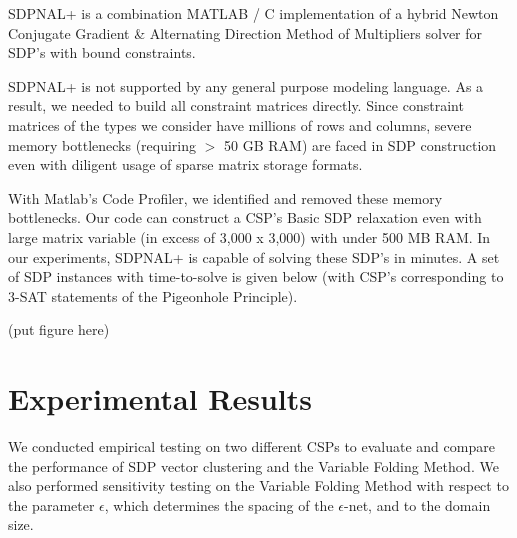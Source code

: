 \documentclass[11pt]{article} %
\begin{document}
SDPNAL+ \cite{yang2015sdpnal+, zhao2010newton} is a combination MATLAB / C implementation of a hybrid Newton Conjugate Gradient \& Alternating Direction Method of Multipliers solver for SDP's with bound constraints.

SDPNAL+ is not supported by any general purpose modeling language. As a result, we needed to build all constraint matrices directly. Since constraint matrices of the types we consider have millions of rows and columns, severe memory bottlenecks (requiring $>$ 50 GB RAM) are faced in SDP construction even with diligent usage of sparse matrix storage formats.

With Matlab's Code Profiler, we identified and removed these memory bottlenecks. Our code can construct a CSP's Basic SDP relaxation even with large matrix variable (in excess of 3,000 x 3,000) with under 500 MB RAM. In our experiments, SDPNAL+ is capable of solving these SDP's in minutes. A set of SDP instances with time-to-solve is given below (with CSP's corresponding to 3-SAT statements of the Pigeonhole Principle).

(put figure here)

\section{Experimental Results}

We conducted empirical testing on two different CSPs to evaluate and compare the performance of SDP vector clustering and the Variable Folding Method. We also performed sensitivity testing on the Variable Folding Method with respect to the parameter $\epsilon$, which determines the spacing of the $\epsilon$-net, and to the domain size.
\end{document}

